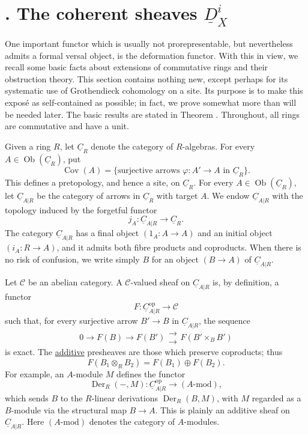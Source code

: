 
\section*{. The coherent sheaves $\underline D_X^i$}

One important functor which is usually not prorepresentable, but
nevertheless admits a formal versal object, is the deformation
functor. With this in view, we recall some basic facts about
extensions of commutative rings and their obstruction theory. This
section contains nothing new, except perhaps for its systematic use
of Grothendieck cohomology on a site. Its purpose is to make this
expos\'e as self-contained as possible; in fact, we prove somewhat
more than will be needed later. The basic results are stated in
Theorem . Throughout, all rings are commutative and have a unit.


Given a ring $R$, let $\underline C_R$ denote the category of
$R$-algebras. For every $A\in\operatorname{Ob}(\underline C_R)$, put
\[
 \operatorname{Cov}(A)=
 \{\text{surjective arrows }\varphi:A'\longrightarrow A
   \text{ in }\underline C_R\}.
\]
This defines a pretopology, and hence a site, on $\underline C_R$.
For every $A\in\operatorname{Ob}(\underline C_R)$, let
$\underline C_{A|R}$ be the category of arrows in $\underline C_R$
with target $A$. We endow $\underline C_{A|R}$ with the topology
induced by the forgetful functor
\[
 j_A:\underline C_{A|R}\longrightarrow\underline C_R.
\]
The category $\underline C_{A|R}$ has a final object
$(1_A:A\longrightarrow A)$ and an initial object
$(i_A:R\longrightarrow A)$, and it admits both fibre products and
coproducts. When there is no risk of confusion, we write simply $B$
for an object $(B\longrightarrow A)$ of $\underline C_{A|R}$.

Let $\mathscr C$ be an abelian category. A $\mathscr C$-valued sheaf
on $\underline C_{A|R}$ is, by definition, a functor
\[
 F:\underline C_{A|R}^{\mathrm{op}}\longrightarrow\mathscr C
\]
such that, for every surjective arrow $B'\longrightarrow B$ in
$\underline C_{A|R}$, the sequence
\[
 0\longrightarrow F(B)\longrightarrow F(B')
 \mathrel{\substack{\longrightarrow\\[-.6ex]\longrightarrow}}
 F(B'\mathbin{\times_B}B')
\]
is exact. The \underline{additive} presheaves are those which
preserve coproducts; thus
\[
 F(B_1\otimes_R B_2)=F(B_1)\oplus F(B_2).
\]
For example, an $A$-module $M$ defines the functor
\[
 \operatorname{Der}_R(-,M):
 \underline C_{A|R}^{\mathrm{op}}\longrightarrow(A\text{-mod}),
\]
which sends $B$ to the $R$-linear derivations
$\operatorname{Der}_R(B,M)$, with $M$ regarded as a $B$-module via
the structural map $B\longrightarrow A$. This is plainly an
additive sheaf on $\underline C_{A|R}$. Here $(A\text{-mod})$ denotes
the category of $A$-modules.

